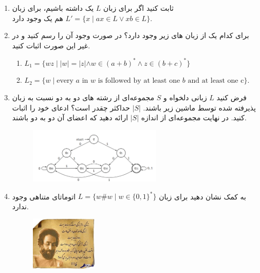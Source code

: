\documentclass{article}
\begin{document}
	\begin{enumerate}
		\item 
		 ثابت کنید اگر برای زبان $ L $ یک  
		داشته باشیم، برای زبان $L' = \{x \; | \; ax \in L  \vee  xb \in L\}$ هم یک   وجود دارد.
		\item 
		برای کدام یک از زبان های زیر  وجود دارد؟ در صورت وجود آن را رسم کنید و در غیر این صورت اثبات کنید.
		
		\begin{latin}
			\begin{enumerate}
				\item 
				$L_1 = \{wz \; | \; |w|=|z| \wedge w \in (a+b)^* \wedge z \in (b+c)^* \}$
				\item 
				$L_2 = \{w \; | \; \text{every $a$ in $w$ is followed by at least one $b$ and at least one c}\}. $
				
				
				
			\end{enumerate}
		\end{latin}

		\item 
		فرض کنید $L$ زبانی دلخواه و $ S $ مجموعه‌ای از رشته های دو به دو
		نسبت به زبان پذیرفته شده توسط ماشین زیر باشند. $|S|$ حداکثر چقدر است؟ ادعای خود را اثبات کنید. در نهایت مجموعه‌ای از اندازه $|S|$ ارائه دهید که اعضای آن دو به دو  باشند.
		\begin{figure}[h]
			\centering
			\includegraphics[width=0.6\textwidth]{image2}
		\end{figure}
	\item 
	 به کمک
	   نشان دهید برای زبان
	 $L = \{w\#w \; |\;  w \in \{0,1\}^* \}$
	  اتوماتای متناهی وجود ندارد.
	  
	\begin{figure}[h]
		\centering
		\includegraphics[width=0.3\textwidth]{image}
	\end{figure}
	\end{enumerate}
\end{document}
